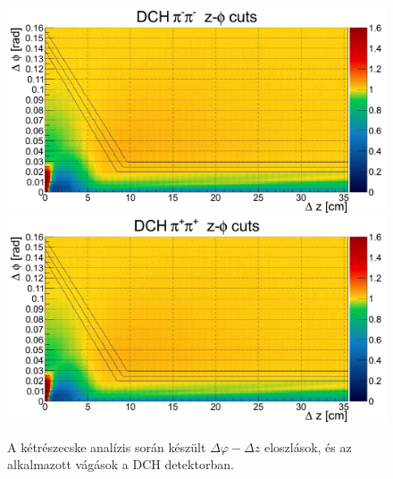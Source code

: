 \documentclass[11pt,a4paper]{article}
\numberwithin{equation}{subsection}
\numberwithin{figure}{section}
\begin{document}
\begin{figure}[H]
\centering
\includegraphics[scale=0.17]{pic/dat/kd/Corr_DCH_dzdp_mm.png}
\includegraphics[scale=0.17]{pic/dat/kd/Corr_DCH_dzdp_pp.png}
\caption{A kétrészecske analízis során készült $\Delta\varphi-\Delta z$ eloszlások, és az alkalmazott vágások a DCH detektorban.}
\label{fig:paircuts1}
\end{figure}
\end{document}

